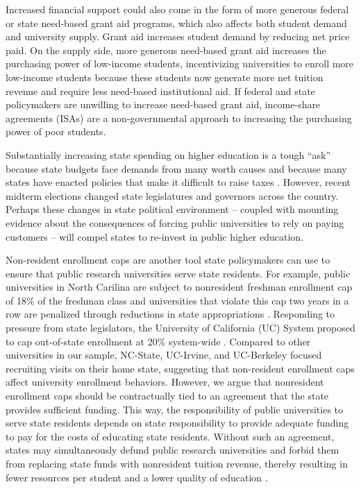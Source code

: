 \documentclass[twoside]{article}
\begin{document}
Increased financial support could also come in the form of more generous federal or state need-based grant aid programs, which also affects both student demand and university supply. Grant aid increases student demand by reducing net price paid.  On the supply side, more generous need-based grant aid increases the purchasing power of low-income students, incentivizing universities to enroll more low-income students because these students now generate more net tuition revenue and require less need-based institutional aid. If federal and state policymakers are unwilling to increase need-based grant aid, income-share agreements (ISAs) are a non-governmental approach to increasing the purchasing power of poor students. 

Substantially increasing state spending on higher education is a tough ``ask'' because state budgets face demands from many worth causes \citep{RN1652} and because many states have enacted policies that make it difficult to raise taxes \citep{RN1646}.  However, recent midterm elections changed state legislatures and governors across the country.  Perhaps these changes in state political environment -- coupled with mounting evidence about the consequences of forcing public universities to rely on paying customers -- will compel states to re-invest in public higher education.

Non-resident enrollment caps are another tool state policymakers can use to ensure that public research universities serve state residents.  For example, public universities in North Carilina are subject to nonresident freshman enrollment cap of 18\% of the freshman class and universities that violate this cap two years in a row are penalized through reductions in state appropriations \citep{RN4424}. Responding to pressure from state legislators, the  University of California (UC) System proposed to cap out-of-state enrollment at 20\% system-wide \citep{RN4247}. Compared to other universities in our sample, NC-State, UC-Irvine, and UC-Berkeley focused recruiting visits on their home state, suggesting that non-resident enrollment caps affect university enrollment behaviors. However, we argue that nonresident enrollment caps should be contractually tied to an agreement that the state provides sufficient funding. This way, the responsibility of public universities to serve state residents depends on state responsibility to provide adequate funding to pay for the costs of educating state residents.  Without such an agreement, states may simultaneously defund public research universities and forbid them from replacing state funds with nonresident tuition revenue, thereby resulting in fewer resources per student and a lower quality of education \citep{RN532}.
\end{document}
